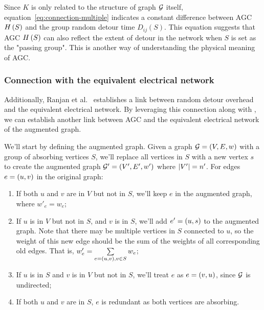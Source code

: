 \documentclass[10pt,twocolumn,twoside]{IEEEtran}
\begin{document}
Since \(K\) is only related to the structure of graph \(\mathcal{G}\) itself, equation~\eqref{eq:connection-multiple} indicates a constant difference between AGC \(H\left(S\right)\) and the group random detour time \(D_{ij}(S)\).
This equation suggests that AGC \(H\left(S\right)\) can also reflect the extent of detour in the network when \(S\) is set as the "passing group".
This is another way of understanding the physical meaning of AGC.

\subsubsection{Connection with the equivalent electrical network}

Additionally, Ranjan et al.~\cite{RaZh13} establishes a link between random detour overhead and the equivalent electrical network.
By leveraging this connection along with , we can establish another link between AGC and the equivalent electrical network of the augmented graph.

We'll start by defining the augmented graph.
Given a graph \(\mathcal{G}=\left( V,E,w \right)\) with a group of absorbing vertices \(S\), we'll replace all vertices in \(S\) with a new vertex \(s\) to create the augmented graph \(\mathcal{G}'=\left( V',E',w' \right)\) where \(\left|V' \right|=n'\).
For edges \(e=\left( u,v \right)\) in the original graph:
\begin{enumerate}
    \item If both \(u\) and \(v\) are in \(V\) but not in \(S\), we'll keep \(e\) in the augmented graph, where \(w'_e=w_e\);
    \item If \(u\) is in \(V\) but not in \(S\), and \(v\) is in \(S\), we'll add \(e'=\left( u,s \right)\) to the augmented graph. Note that there may be multiple vertices in \(S\) connected to \(u\), so the weight of this new edge should be the sum of the weights of all corresponding old edges. That is, \(w'_e=\sum\limits_{e=\left( u,v \right),v\in S}w_e\);
    \item If \(u\) is in \(S\) and \(v\) is in \(V\) but not in \(S\), we'll treat \(e\) as \(e=\left( v,u \right)\), since \(\mathcal{G}\) is undirected;
    \item If both \(u\) and \(v\) are in \(S\), \(e\) is redundant as both vertices are absorbing.
\end{enumerate}
\end{document}
